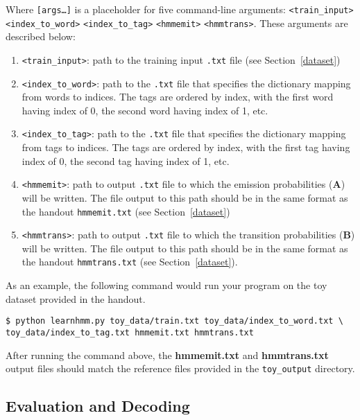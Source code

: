\documentclass[11pt,addpoints,answers]{exam}
\begin{document}
Where \texttt{[args\dots]} is a placeholder for five command-line arguments: \texttt{<train\_input>} \texttt{<index\_to\_word>} \texttt{<index\_to\_tag>} \texttt{<hmmemit>} \texttt{<hmmtrans>}. These arguments are described below:
\begin{enumerate}
    \item \texttt{<train\_input>}: path to the training input \texttt{.txt} file (see Section~\ref{dataset})
    \item \texttt{<index\_to\_word>}: path to the \texttt{.txt} file that specifies the dictionary mapping from words to indices. The tags are ordered by index, with the first word having index of 0, the second word having index of 1, etc.
    \item \texttt{<index\_to\_tag>}: path to the \texttt{.txt} file that specifies the dictionary mapping from tags to indices. The tags are ordered by index, with the first tag having index of 0, the second tag having index of 1, etc.
    \item \texttt{<hmmemit>}: path to output \texttt{.txt} file to which the emission probabilities ($\mathbf A$) will be written. The file output to this path should be in the same format as the handout \texttt{hmmemit.txt} (see Section~\ref{dataset})
    \item \texttt{<hmmtrans>}: path to output \texttt{.txt} file to which the transition probabilities ($\mathbf B$) will be written. The file output to this path should be in the same format as the handout \texttt{hmmtrans.txt} (see Section~\ref{dataset}).
\end{enumerate}
\vspace{0.2 in}
As an example, the following command would run your program on the toy dataset provided in the
handout.
\begin{lstlisting}
$ python learnhmm.py toy_data/train.txt toy_data/index_to_word.txt \ 
toy_data/index_to_tag.txt hmmemit.txt hmmtrans.txt
\end{lstlisting}

After running the command above, the \textbf{hmmemit.txt} and \textbf{hmmtrans.txt} output files should match the reference files provided in the \texttt{toy\_output} directory.

\newpage

\subsection{Evaluation and Decoding}
\label{forback}
\end{document}
